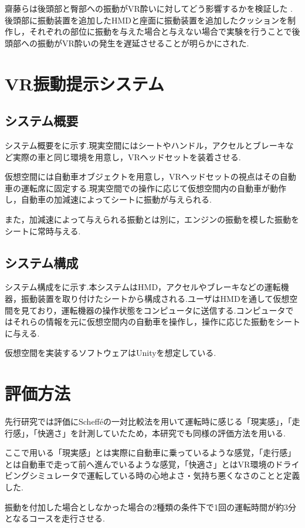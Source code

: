 \documentclass[uplatex]{jsarticle}
\begin{document}
齋藤らは後頭部と臀部への振動がVR酔いに対してどう影響するかを検証した\cite{cybsick_delay_by_vibrate}
.
後頭部に振動装置を追加したHMDと座面に振動装置を追加したクッションを制作し，それぞれの部位に振動を与えた場合と与えない場合で実験を行うことで後頭部への振動がVR酔いの発生を遅延させることが明らかにされた.


\section{VR振動提示システム}
\subsection{システム概要}
システム概要をに示す.現実空間にはシートやハンドル，アクセルとブレーキなど実際の車と同じ環境を用意し，VRヘッドセットを装着させる.

仮想空間には自動車オブジェクトを用意し，VRヘッドセットの視点はその自動車の運転席に固定する.現実空間での操作に応じて仮想空間内の自動車が動作し，自動車の加減速によってシートに振動が与えられる.

また，加減速によって与えられる振動とは別に，エンジンの振動を模した振動をシートに常時与える.

\subsection{システム構成}
システム構成をに示す.本システムはHMD，アクセルやブレーキなどの運転機器，振動装置を取り付けたシートから構成される.ユーザはHMDを通して仮想空間を見ており，運転機器の操作状態をコンピュータに送信する.コンピュータではそれらの情報を元に仮想空間内の自動車を操作し，操作に応じた振動をシートに与える.

仮想空間を実装するソフトウェアはUnityを想定している.




\section{評価方法}
先行研究では評価にSchefféの一対比較法を用いて運転時に感じる「現実感」，「走行感」，「快適さ」を計測していたため，本研究でも同様の評価方法を用いる.

ここで用いる「現実感」とは実際に自動車に乗っているような感覚，「走行感」とは自動車で走って前へ進んでいるような感覚，「快適さ」とはVR環境のドライビングシミュレータで運転している時の心地よさ・気持ち悪くなさのことと定義した.

振動を付加した場合としなかった場合の2種類の条件下で1回の運転時間が約3分となるコースを走行させる.
\end{document}
